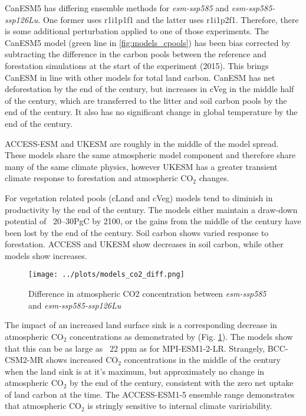 \documentclass[]{article}
\begin{document}
CanESM5 has differing ensemble methods for \textit{esm-ssp585} and \textit{esm-ssp585-ssp126Lu}.
One former uses r1i1p1f1 and the latter uses r1i1p2f1.
Therefore, there is some additional perturbation applied to one of those experiments.
The CanESM5 model (green line in \ref{fig:models_cpools}) has been bias corrected by subtracting the difference in the carbon pools between the reference and forestation simulations at the start of the experiment (2015).
This brings CanESM in line with other models for total land carbon.
CanESM has net deforestation by the end of the century, but increases in cVeg in the middle half of the century, which are transferred to the litter and soil carbon pools by the end of the century.
It also has no significant change in global temperature by the end of the century.

ACCESS-ESM and UKESM are roughly in the middle of the model spread.
These models share the same atmospheric model component and therefore share many of the same climate physics, however UKESM has a greater transient climate response to forestation and atmospheric CO$_2$ changes.

For vegetation related pools (cLand and cVeg) models tend to diminish in productivity by the end of the century.
The models  either maintain a draw-down potential of ~20–30PgC by 2100, or the gains from the middle of the century have been lost by the end of the century.
Soil carbon shows varied response to forestation. ACCESS and UKESM show decreases in soil carbon, while other models show increases.

\begin{figure}
    \centering
    \texttt{[image: ../plots/models\_co2\_diff.png]}
    \caption{Difference in atmospheric CO2 concentration between \textit{esm-ssp585} and \textit{esm-ssp585-ssp126Lu}}
    \label{fig:models_CO2}
\end{figure}

The impact of an increased land surface sink is a corresponding decrease in atmospheric CO$_2$ concentrations as demonstrated by (Fig. \ref{fig:models_CO2}).
The models show that this can be as large as ~22 ppm as for MPI-ESM1-2-LR.
Strangely, BCC-CSM2-MR shows increased CO$_2$ concentrations in the middle of the century when the land sink is at it's maximum, but approximately no change in atmospheric CO$_2$ by the end of the century, consistent with the zero net uptake of land carbon at the time.
The ACCESS-ESM1-5 ensemble range demonstrates that atmospheric CO$_2$ is stringly sensitive to internal climate variriability.
\end{document}
